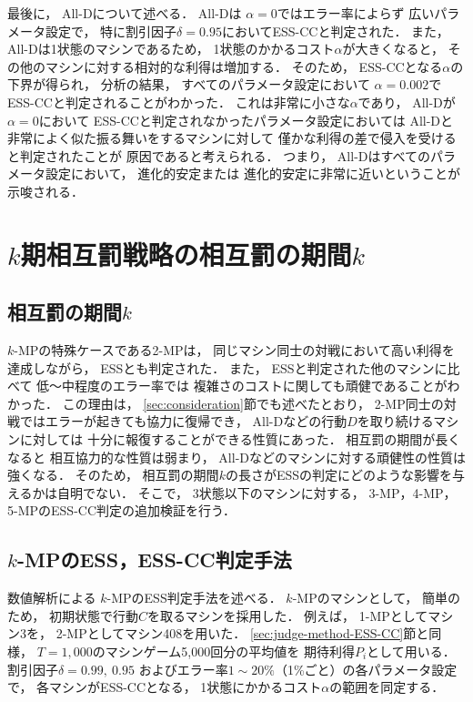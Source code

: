\documentclass[submit]{ipsj}
\theoremstyle{definition}
\begin{document}
最後に，
All-Dについて述べる．
All-Dは
$\alpha=0$ではエラー率によらず
広いパラメータ設定で，
特に割引因子$\delta=0.95$においてESS-CCと判定された．
また，
All-Dは1状態のマシンであるため，
1状態のかかるコスト$\alpha$が大きくなると，
その他のマシンに対する相対的な利得は増加する．
そのため，
ESS-CCとなる$\alpha$の下界が得られ，
分析の結果，
すべてのパラメータ設定において
$\alpha=0.002$でESS-CCと判定されることがわかった．
これは非常に小さな$\alpha$であり，
All-Dが$\alpha=0$において
ESS-CCと判定されなかったパラメータ設定においては
All-Dと非常によく似た振る舞いをするマシンに対して
僅かな利得の差で侵入を受けると判定されたことが
原因であると考えられる．
つまり，
All-Dはすべてのパラメータ設定において，
進化的安定または
進化的安定に非常に近いということが示唆される．

\section{$k$期相互罰戦略の相互罰の期間$k$} \label{sec:k-MP}

\subsection{相互罰の期間$k$} \label{sec:punishment-k}

$k$-MPの特殊ケースである2-MPは，
同じマシン同士の対戦において高い利得を達成しながら，
ESSとも判定された．
また，
ESSと判定された他のマシンに比べて
低〜中程度のエラー率では
複雑さのコストに関しても頑健であることがわかった．
この理由は，
\ref{sec:consideration}節でも述べたとおり，
2-MP同士の対戦ではエラーが起きても協力に復帰でき，
All-Dなどの行動$D$を取り続けるマシンに対しては
十分に報復することができる性質にあった．
相互罰の期間が長くなると
相互協力的な性質は弱まり，
All-Dなどのマシンに対する頑健性の性質は強くなる．
そのため，
相互罰の期間$k$の長さがESSの判定にどのような影響を与えるかは自明でない．
そこで，
3状態以下のマシンに対する，
3-MP，4-MP，5-MPのESS-CC判定の追加検証を行う．

\subsection{$k$-MPのESS，ESS-CC判定手法} \label{sec:judge-method-ESS-CC-kMP}

数値解析による
$k$-MPのESS判定手法を述べる．
$k$-MPのマシンとして，
簡単のため，
初期状態で行動$C$を取るマシンを採用した．
例えば，
1-MPとしてマシン3を，
2-MPとしてマシン408を用いた．
\ref{sec:judge-method-ESS-CC}節と同様，
$T = 1,000$のマシンゲーム5,000回分の平均値を
期待利得$P_i$として用いる．
割引因子$\delta = 0.99,\ 0.95$
およびエラー率$1 \sim 20\%$（1\%ごと）の各パラメータ設定で，
各マシンがESS-CCとなる，
1状態にかかるコスト$\alpha$の範囲を同定する．
\end{document}
